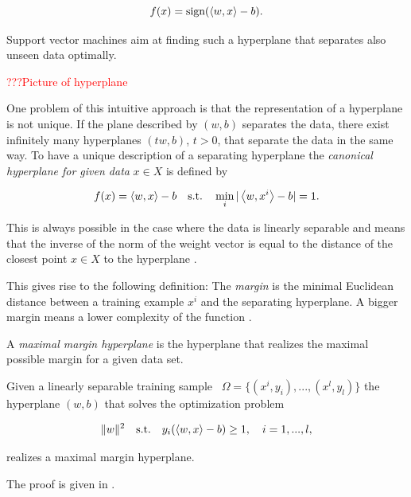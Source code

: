 \[ f(x) = \text{sign}(\left\langle w,x\right\rangle-b). \]

Support vector machines aim at finding such a hyperplane that separates also unseen data optimally.

\textcolor{red}{???Picture of hyperplane}

One problem of this intuitive approach is that the representation of a hyperplane is not unique. If the plane described by \((w,b)\) separates the data, there exist infinitely many hyperplanes \((tw,b)\), \(t>0\), that separate the data in the same way.
To have a unique description of a separating hyperplane the \emph{canonical hyperplane for given data} \(x \in X\) is defined by 

\[ f(x) = \left\langle w, x\right\rangle - b  \quad \text{s.t.} \quad \min_i \vert\left\langle w,x^i\right\rangle -b\vert = 1.\] 

This is always possible in the case where the data is  linearly separable and means that the inverse of the norm of the weight vector is equal to the distance of the closest point \(x \in X \) to  the hyperplane \cite[p. 10]{Kunapuli2008}.



This gives rise to the following definition:
The \emph{margin} is the minimal Euclidean distance between a training example \(x^i\) and the separating hyperplane.
A bigger margin means a lower complexity of the function \cite{Cristianini2000}. 

A \emph{maximal margin hyperplane} is the hyperplane that realizes the maximal possible margin for a given data set.

\begin{proposition}
Given a linearly separable training sample \ \(\Omega = \{(x^i,y_i),...,(x^l,y_l)\}\) the hyperplane \((w,b)\) that solves the optimization problem

\[\|w\|^2 \quad \text{s.t.} \quad y_i(\left\langle w,x\right\rangle-b)\geq 1, \quad i = 1,...,l, \]

realizes a maximal margin hyperplane.
\end{proposition}

The proof is given in \cite[chapter 6.1]{Cristianini2000}. 

